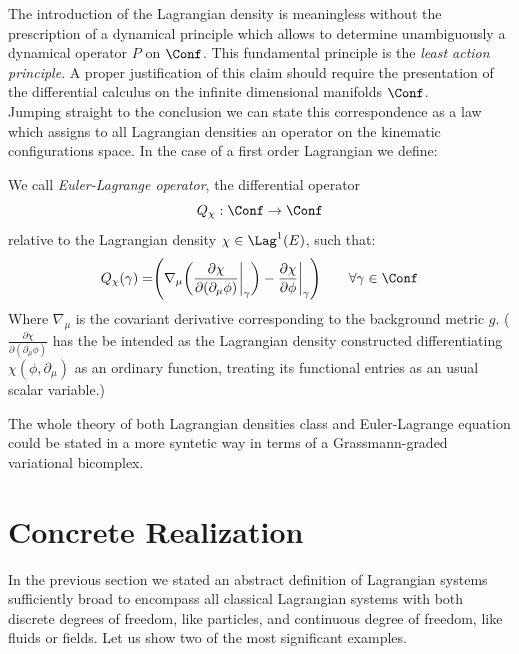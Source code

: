 \documentclass[Main]{subfiles}
\begin{document}
	The introduction of the Lagrangian density is meaningless without the prescription of a dynamical principle which allows to determine unambiguously a dynamical operator $P$ on $\Conf$.
	This fundamental principle is the \emph{least action principle}.
	A proper justification of this claim should require the presentation of the differential calculus on the infinite dimensional manifolds $\Conf$. 
	\\
	Jumping straight to the conclusion we can state this correspondence as a law which assigns to all Lagrangian densities an operator on the kinematic configurations space. In the case of a first order Lagrangian we define:
	\begin{definition}
	We call \emph{Euler-Lagrange operator}, the  differential operator
		\begin{displaymath}
			Q_\chi : \Conf \rightarrow \Conf
		\end{displaymath}
		relative to the Lagrangian density $\chi \in \Lag^1(E)$, such that:
		\begin{equation}
			Q_\chi (\gamma) = \Biggr( \nabla_\mu \biggr( \frac{\partial \chi}{\partial(\partial_\mu \phi)} \biggr\vert_\gamma \biggr) - \frac{\partial \chi}{\partial \phi}\biggr\vert_\gamma \Biggr) \qquad \forall \gamma \in \Conf
		\end{equation}
		Where $\nabla_\mu$ is the covariant derivative corresponding to the background metric $g$.
		($\frac{\partial \chi}{\partial(\partial_\mu \phi)}$ has the be intended as the Lagrangian density constructed differentiating $\chi(\phi, \partial_\mu)$ as an ordinary function, treating its functional entries as an usual scalar variable.)
	\end{definition}
	
	\begin{observation}
		The whole theory of both Lagrangian densities class and Euler-Lagrange equation could be stated in a more syntetic way in terms of a Grassmann-graded variational bicomplex.\cite{Giachetta2009}\cite{Sardanashvily}
	\end{observation}
	
		

	\section{Concrete Realization}
		In the previous section we stated an abstract definition of Lagrangian systems sufficiently broad to encompass all  classical Lagrangian systems with both discrete degrees of freedom, like particles, and continuous degree of freedom, like fluids or fields.
	Let us show two of the most significant examples.
	
\end{document}
